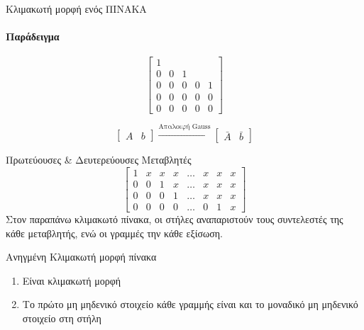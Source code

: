 \documentclass[11pt,a4paper,notitlepage,fleqn]{article}
\begin{document}
\begin{itemize}
\begin{defn}{Κλιμακωτή μορφή ενός ΠΙΝΑΚΑ}{}
		\paragraph{Παράδειγμα}
		\[
		\left[\begin{matrix}
		1 & & & & \\0 & 0 & 1 & & \\
		0 & 0 & 0 & 0 & 1 \\
		0 & 0 & 0 & 0 & 0 \\
		0 & 0 & 0 & 0 & 0
		\end{matrix}\right]
		\]
	\end{defn}
	\[
	\left[\begin{array}{c|c}
	A & b\end{array}
	\right]
	 \xrightarrow{\text{Απαλοιφή Gauss}} \left[\begin{array}{c|c}
	\bar A & \bar b
	\end{array}
	\right]
	\]
	\begin{defn}{Πρωτεύουσες \& Δευτερεύουσες Μεταβλητές}{}
		\[
		\left[\begin{array}{ccccccc|c}
		\boxed{1}&x&x&x&\hdots &x&x&x \\
		0 & 0 & \boxed{1} & x & \hdots & x & x & x \\
		0 & 0 & 0 & \boxed{1} & \hdots & x & x & x \\
		0 & 0 & 0 & 0 & \hdots & 0 & \boxed{1} & x
		\end{array}\right]
		\]
		\tcblower
		Στον παραπάνω κλιμακωτό πίνακα, οι στήλες αναπαριστούν τους
		συντελεστές της κάθε μεταβλητής, ενώ οι γραμμές την κάθε
		εξίσωση.
	\end{defn}
	\begin{defn}{Ανηγμένη Κλιμακωτή μορφή πίνακα}{}
		\begin{enumerate}
			\item Είναι κλιμακωτή μορφή
			\item Το πρώτο μη μηδενικό στοιχείο κάθε γραμμής είναι και το
			μοναδικό μη μηδενικό στοιχείο στη στήλη
		\end{enumerate}
	\end{defn}

\end{itemize}
\end{document}
